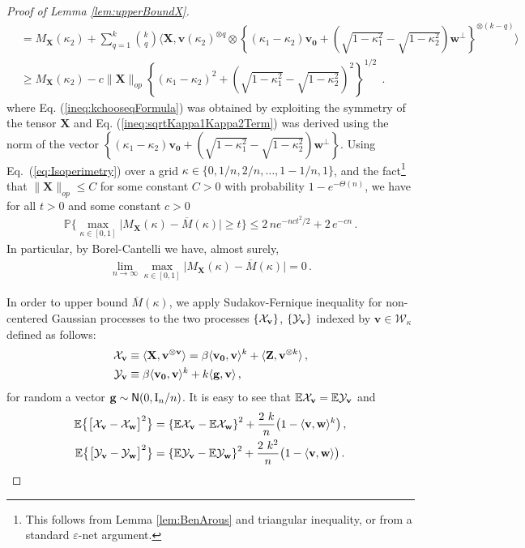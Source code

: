 \documentclass[11pt]{article}
\theoremstyle{definition}
\def\oM{\overline{M}}
\def\<{\langle}
\def\>{\rangle}
\def\prob{{\mathbb P}}
\def\E{{\mathbb E}} %
\def\bv{\mathbf{v}}
\def\bg{\mathbf{g}}
\def\bw{\mathbf{w}}
\def\bvz{\mathbf{v_0}}
\def\bX{\mathbf{X}}
\def\bZ{\mathbf{Z}}
\def\cW{\mathcal{W}}
\def\E{\mathbb{E}}
\def\normal{{\sf N}}
\def\id{{\rm I}}
\def\eps{\varepsilon}
\def\cX{{\cal X}}
\def\cY{{\cal Y}}
\begin{document}
\begin{proof}[Proof of Lemma \ref{lem:upperBoundX}]
\begin{align}
& = M_\bX(\kappa_2) + \sum_{q = 1}^k { k \choose q}\<\bX,
\bv(\kappa_2)^{\otimes q} \otimes \left \{(\kappa_1 - \kappa_2)\bvz + (\sqrt{1-\kappa_1^2} - \sqrt{1-\kappa_2^2})\bw^\perp \right \}^{\otimes (k-q)} \>\label{ineq:kchooseqFormula} \\
&\geq  M_\bX(\kappa_2)  - c \|\bX\|_{op} \left \{ (\kappa_1 - \kappa_2)^2+ \left (\sqrt{1-\kappa_1^2} - \sqrt{1- \kappa_2^2}\right )^2 \right \}^{1/2}~~. \label{ineq:sqrtKappa1Kappa2Term}
%
\end{align}
%
where Eq. (\ref{ineq:kchooseqFormula}) was obtained by exploiting the symmetry of the tensor $\bX$ and Eq. (\ref{ineq:sqrtKappa1Kappa2Term}) was derived using the norm of the vector $\left \{(\kappa_1 - \kappa_2)\bvz + (\sqrt{1-\kappa_1^2} - \sqrt{1-\kappa_2^2})\bw^\perp \right \}$.
Using Eq.~(\ref{eq:Isoperimetry}) over a grid $\kappa\in
\{0,1/n,2/n,\dots, 1-1/n, 1\}$, and the fact\footnote{This follows
  from Lemma \ref{lem:BenArous} and triangular inequality, or from a
  standard $\eps$-net argument.} that $\|\bX\|_{op}\le C$
for some constant $C>0$ with probability $1-e^{-\Theta(n)}$, we have for all $t > 0$
and some constant $c>0$
%
\begin{align}
%
\prob \Big\{\max_{\kappa\in [0,1]} \big|M_{\bX}(\kappa) - \oM(\kappa)\big| \ge t \Big\}
  \le 2\, n
  e^{-n c t^2/2} + 2\, e^{-cn}\, . 
%
\end{align}
%
In particular, by Borel-Cantelli we have, almost surely,
%
\begin{align}
%
\lim_{n\to\infty}\max_{\kappa\in [0,1]} \big|M_{\bX}(\kappa) -
\oM(\kappa)\big| =0\, . \label{eq:MoM}
%
\end{align}

In order to upper bound $\oM(\kappa)$, we apply Sudakov-Fernique inequality for non-centered Gaussian processes \cite[Theorem 1]{vitale2000some} to the two processes $\{\cX_\bv\}$, $\{\cY_\bv\}$ indexed by
$\bv \in \cW_{\kappa}$ defined as follows:
%
\begin{align}
%
\cX_\bv & \equiv \<\bX, \bv^{\otimes \bv} \>=  \beta \langle \bvz, \bv\rangle^k+\< \bZ, \bv^{\otimes k} \>\, ,\\
\cY_\bv & \equiv \beta\langle \bvz, \bv\rangle^k+  k \langle \bg , \bv\rangle \, ,
%
\end{align}
%
for random a vector $\bg \sim \normal(0, \id_n / n)$. It is easy to see that $\E\cX_\bv = \E\cY_\bv$ and 
%
\begin{align}
%
\E\big\{\big[\cX_\bv-\cX_\bw \big]^2\big\}&  = \left \{ \E\cX_\bv - \E \cX_\bw\right \}^2 + 
\frac{2 ~k }{n}
\big(1-\<\bv,\bw\>^k\big)\, ,\\
\E\big\{\big[\cY_\bv-\cY_\bw\big]^2\big\}&  =   \left \{ \E\cY_\bv - \E\cY_\bw \right \} ^2 + \frac{2~k^2 }{n}
\big(1-\<\bv,\bw\>\big)\, .
%
\end{align}
%


\end{proof}
\end{document}
